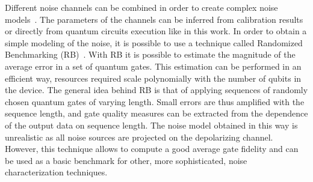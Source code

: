\documentclass[referee,sn-basic]{sn-jnl} %
\begin{document}
\noindent
Different noise channels can be combined in order to create complex noise models~\cite{PhysRevA.104.062432, article_model_realistic}. 
The parameters of the channels can be inferred from calibration results or directly from quantum circuits execution like in this work.
In order to obtain a simple modeling of the noise, it is possible to use a technique called Randomized Benchmarking 
(RB)~\cite{Emerson_2005, heinrich2023randomized, 2019npj}.
With RB it is possible to estimate the magnitude of the average error in a set of quantum gates. 
This estimation can be performed in an efficient way, resources required scale polynomially with the number of qubits in the device. 
The general idea behind RB is that of applying sequences of randomly chosen quantum gates of varying length. 
Small errors are thus amplified with the sequence length, and gate quality measures can be extracted from the dependence of the output data on sequence length.
The noise model obtained in this way is unrealistic as all noise sources are projected on the depolarizing channel. 
However, this technique allows to compute a good average gate fidelity and can be used as a basic benchmark for other, more sophisticated, 
noise characterization techniques.



    
\end{document}
